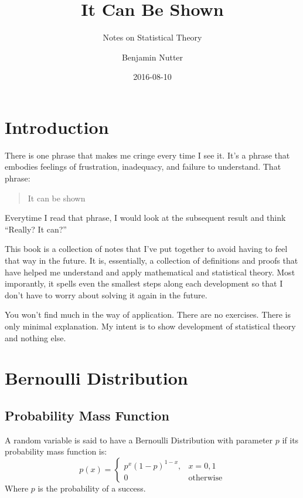 \documentclass[]{book}
\title{It Can Be Shown}
\subtitle{Notes on Statistical Theory}
\author{Benjamin Nutter}
\date{2016-08-10}
\begin{document}
\maketitle

{
\setcounter{tocdepth}{1}
\tableofcontents
}
\chapter{Introduction}\label{introduction}

There is one phrase that makes me cringe every time I see it. It's a
phrase that embodies feelings of frustration, inadequacy, and failure to
understand. That phrase:

\begin{quote}
It can be shown
\end{quote}

Everytime I read that phrase, I would look at the subsequent result and
think ``Really? It can?''

This book is a collection of notes that I've put together to avoid
having to feel that way in the future. It is, essentially, a collection
of definitions and proofs that have helped me understand and apply
mathematical and statistical theory. Most imporantly, it spells even the
smallest steps along each development so that I don't have to worry
about solving it again in the future.

You won't find much in the way of application. There are no exercises.
There is only minimal explanation. My intent is to show development of
statistical theory and nothing else.

\chapter{Bernoulli Distribution}\label{bernoulli-distribution}

\section{Probability Mass Function}\label{probability-mass-function}

A random variable is said to have a Bernoulli Distribution with
parameter \(p\) if its probability mass function is: \[p(x)=\left\{ 
        \begin{array}{ll}
            p^x(1-p)^{1-x}, & x=0,1\\
            0       & \mathrm{otherwise}
        \end{array} 
    \right. \] Where \(p\) is the probability of a success.
\end{document}
